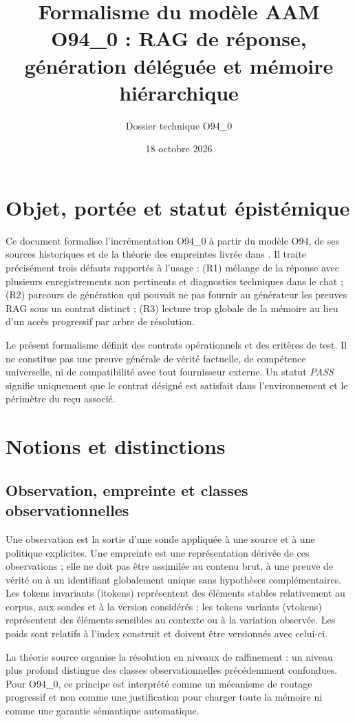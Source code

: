\documentclass[11pt,a4paper]{article}
\title{Formalisme du modèle AAM O94\_0 : RAG de réponse, génération déléguée et mémoire hiérarchique}
\author{Dossier technique O94\_0}
\date{18 octobre 2026}
\begin{document}
\maketitle
\tableofcontents
\newpage

\section{Objet, portée et statut épistémique}
Ce document formalise l'incrémentation O94\_0 à partir du modèle O94, de ses sources historiques et de la théorie des empreintes livrée dans . Il traite précisément trois défauts rapportés à l'usage : (R1) mélange de la réponse avec plusieurs enregistrements non pertinents et diagnostics techniques dans le chat ; (R2) parcours de génération qui pouvait ne pas fournir au générateur les preuves RAG sous un contrat distinct ; (R3) lecture trop globale de la mémoire au lieu d'un accès progressif par arbre de résolution.

Le présent formalisme définit des contrats opérationnels et des critères de test. Il ne constitue pas une preuve générale de vérité factuelle, de compétence universelle, ni de compatibilité avec tout fournisseur externe. Un statut \emph{PASS} signifie uniquement que le contrat désigné est satisfait dans l'environnement et le périmètre du reçu associé.

\section{Notions et distinctions}
\subsection{Observation, empreinte et classes observationnelles}
Une observation est la sortie d'une sonde appliquée à une source et à une politique explicites. Une empreinte est une représentation dérivée de ces observations ; elle ne doit pas être assimilée au contenu brut, à une preuve de vérité ou à un identifiant globalement unique sans hypothèses complémentaires. Les tokens invariants (itokens) représentent des éléments stables relativement au corpus, aux sondes et à la version considérés ; les tokens variants (vtokens) représentent des éléments sensibles au contexte ou à la variation observée. Les poids sont relatifs à l'index construit et doivent être versionnés avec celui-ci.

La théorie source organise la résolution en niveaux de raffinement : un niveau plus profond distingue des classes observationnelles précédemment confondues. Pour O94\_0, ce principe est interprété comme un mécanisme de routage progressif et non comme une justification pour charger toute la mémoire ni comme une garantie sémantique automatique.
\end{document}
